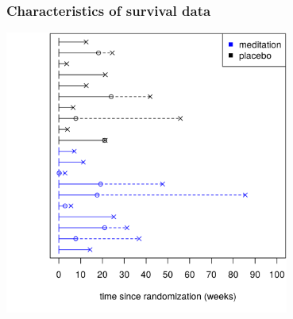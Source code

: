 \documentclass[10pt,t]{beamer}
\begin{document}
\begin{frame}
\frametitle{Characteristics of survival data}
\centering
\includegraphics[width=0.7\textwidth]{figs/meditation_censored_rand_time.png}
\end{frame}
\end{document}
